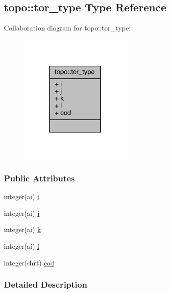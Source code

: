 \hypertarget{structtopo_1_1tor__type}{\subsection{topo\-:\-:tor\-\_\-type Type Reference}
\label{structtopo_1_1tor__type}
}


Collaboration diagram for topo\-:\-:tor\-\_\-type\-:
\nopagebreak
\begin{figure}[H]
\begin{center}
\leavevmode
\includegraphics[width=158pt]{structtopo_1_1tor__type__coll__graph}
\end{center}
\end{figure}
\subsubsection*{Public Attributes}
\begin{DoxyCompactItemize}
\item 
integer(ai) \hyperlink{structtopo_1_1tor__type_afadf15821c0373a47c445368d00a5ad5}{i}
\item 
integer(ai) \hyperlink{structtopo_1_1tor__type_a2742c4c505d4a703db18f8c1e6ed4d0f}{j}
\item 
integer(ai) \hyperlink{structtopo_1_1tor__type_a6fbc36e49f995a242a3a3684c74477ff}{k}
\item 
integer(ai) \hyperlink{structtopo_1_1tor__type_af5a39599e244741b2ba49b9db0ca46c1}{l}
\item 
integer(shrt) \hyperlink{structtopo_1_1tor__type_ae3b1ebe21ecf310ce65ebb194857ac2b}{cod}
\end{DoxyCompactItemize}


\subsubsection{Detailed Description}



